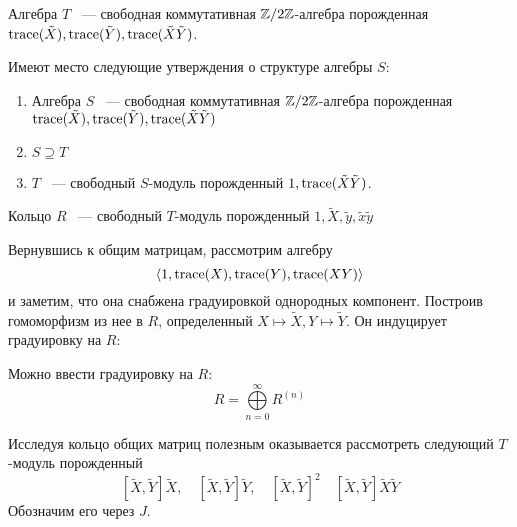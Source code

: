 \begin{proposition}
    Алгебра $T$ ~--- свободная коммутативная $\mathbb{Z}/2\mathbb{Z}$-алгебра порожденная $\mathrm{trace}(\tilde{X}), \mathrm{trace}(\tilde{Y}), \mathrm{trace}(\tilde{X}\tilde{Y})$.
\end{proposition}
\begin{proposition}
    Имеют место следующие утверждения о структуре алгебры $S$:
    \begin{enumerate}
        \item Алгебра $S$ ~--- свободная коммутативная $\mathbb{Z}/2\mathbb{Z}$-алгебра порожденная $\mathrm{trace}(\tilde{X}), \mathrm{trace}(\tilde{Y}), \mathrm{trace}(\tilde{X}\tilde{Y})$
        \item $S\supseteq T$
        \item $T$ ~--- свободный  $S$-модуль порожденный $1, \mathrm{trace}(\tilde{X}\tilde{Y})$.
    \end{enumerate}
\end{proposition}
\begin{proposition}
    Кольцо $R$ ~--- свободный $T$-модуль порожденный $1, \tilde{X}, \tilde{y}, \tilde{x}\tilde{y}$
\end{proposition}
Вернувшись к общим матрицам, рассмотрим алгебру
\[
    \langle 1, \mathrm{trace}(X), \mathrm{trace}(Y), \mathrm{trace}(XY) \rangle
\]
и заметим, что она снабжена градуировкой однородных компонент.
Построив гомоморфизм из нее в $R$, определенный $X\mapsto \tilde{X}, Y\mapsto\tilde{Y}$.
Он индуцирует градуировку на $R$:
\begin{proposition}
    Можно ввести градуировку на $R$:
    \[
        R = \bigoplus\limits_{n=0}^{\infty} R^{(n)}
    \]
\end{proposition}

Исследуя кольцо общих матриц полезным оказывается рассмотреть следующий $T$-модуль порожденный
\[
    [\tilde{X}, \tilde{Y}] \tilde{X}, \quad [\tilde{X}, \tilde{Y}] \tilde{Y}, \quad [\tilde{X}, \tilde{Y}]^2 \quad [\tilde{X}, \tilde{Y}]\tilde{X}\tilde{Y}
\]
Обозначим его через $J$.

